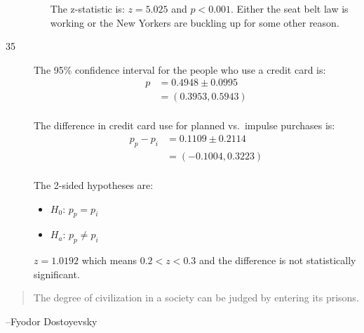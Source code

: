 \documentclass[letterpaper]{exam}
\begin{document}
\begin{description}
\begin{enumerate}[label = {(\alph*)}]
            The z-statistic is: $z = 5.025$ and $p < 0.001$. Either the seat belt law
            is working or the New Yorkers are buckling up for some other reason.
        \end{enumerate}

      \item[35]
        The 95\% confidence interval for the people who use a credit card is:
        \begin{align*}
          p & = 0.4948 \pm 0.0995 \\
            & = (0.3953, 0.5943) \\
        \end{align*}

        The difference in credit card use for planned vs.\ impulse purchases is:
        \begin{align*}
          p_{p} - p_i & = 0.1109 \pm 0.2114 \\
                       & = (-0.1004, 0.3223) \\
        \end{align*}

        The 2-sided hypotheses are:
        \begin{itemize}[label = {}, parsep = 0pt]
          \item $H_0$: $p_p = p_i$
          \item $H_a$: $p_p \ne p_i$
        \end{itemize}

        $z = 1.0192$ which means $0.2 < z < 0.3$ and the difference is not
        statistically significant.

  \end{description}

  \else
    \vspace{12 cm}
    \begin{quote}
      \begin{em}
        The degree of civilization in a society can be judged by entering its prisons. 
      \end{em}
    \end{quote}
    \hspace{1 cm}--Fyodor Dostoyevsky
  \fi
\end{document}
